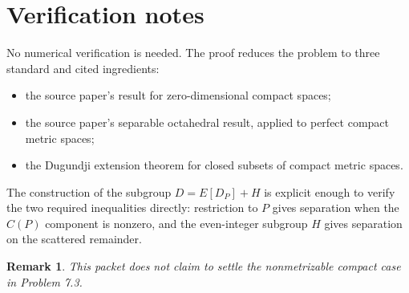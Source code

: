 \documentclass[11pt]{article}
\newtheorem{remark}{Remark}
\begin{document}
\section{Verification notes}

No numerical verification is needed.  The proof reduces the problem to three
standard and cited ingredients:
\begin{itemize}
\item the source paper's result for zero-dimensional compact spaces;
\item the source paper's separable octahedral result, applied to perfect
compact metric spaces;
\item the Dugundji extension theorem for closed subsets of compact metric
spaces.
\end{itemize}
The construction of the subgroup $D=E[D_P]+H$ is explicit enough to verify
the two required inequalities directly: restriction to $P$ gives separation
when the $C(P)$ component is nonzero, and the even-integer subgroup $H$ gives
separation on the scattered remainder.

\begin{remark}
This packet does not claim to settle the nonmetrizable compact case in
Problem 7.3.
\end{remark}
\end{document}
